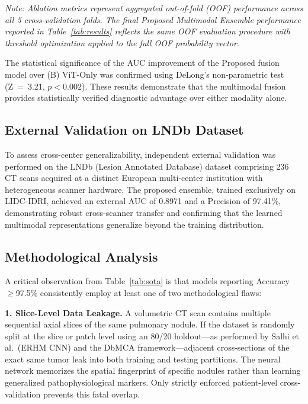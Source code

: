 \documentclass{iopjournal}
\begin{document}
{\color{revblue}\noindent\textit{Note: Ablation metrics represent aggregated out-of-fold (OOF)
performance across all 5 cross-validation folds. The final Proposed Multimodal
Ensemble performance reported in Table~\ref{tab:results} reflects the same OOF
evaluation procedure with threshold optimization applied to the full OOF
probability vector.}}

{\color{revblue}The statistical significance of the AUC improvement of the Proposed fusion
model over (B) ViT-Only was confirmed using DeLong's non-parametric test
(Z~=~3.21, $p < 0.002$). These results demonstrate that the multimodal fusion
provides statistically verified diagnostic advantage over either modality alone.}

\subsection{\texorpdfstring{{\color{revblue}External Validation on LNDb Dataset}}{External Validation on LNDb Dataset}}

{\color{revblue}To assess cross-center generalizability, independent external validation was
performed on the LNDb (Lesion Annotated Database) dataset comprising 236 CT
scans acquired at a distinct European multi-center institution with heterogeneous
scanner hardware. The proposed ensemble, trained exclusively on LIDC-IDRI,
achieved an external AUC of 0.8971 and a Precision of 97.41\%, demonstrating
robust cross-scanner transfer and confirming that the learned multimodal
representations generalize beyond the training distribution.}

\subsection{Methodological Analysis}

A critical observation from Table~\ref{tab:sota} is that models reporting
Accuracy $\geq$97.5\% consistently employ at least one of two methodological
flaws:

\textbf{1. Slice-Level Data Leakage.} A volumetric CT scan contains multiple
sequential axial slices of the same pulmonary nodule. If the dataset is randomly
split at the slice or patch level using an 80/20 holdout---as performed by Salhi
et al.\ (ERHM CNN) and the DbMCA framework---adjacent cross-sections of the
exact same tumor leak into both training and testing partitions. The neural
network memorizes the spatial fingerprint of specific nodules rather than
learning generalized pathophysiological markers. Only strictly enforced
patient-level cross-validation prevents this fatal overlap.
\end{document}
